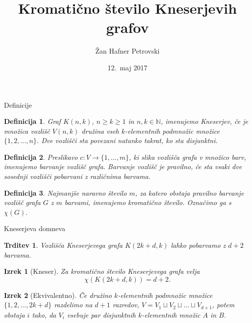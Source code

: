 \documentclass{beamer}
\title{Kromatično število Kneserjevih grafov}
\author{Žan Hafner Petrovski}
\institute{Fakulteta za matematiko in fiziko \\
Oddelek za matematiko}
\date{12.\ maj 2017}
\newtheorem{izrek}{Izrek}
\newtheorem{trditev}{Trditev}
\newtheorem{definicija}{Definicija}
\begin{document}

\begin{frame}
\titlepage
\end{frame}


\begin{frame}{Definicije}

\begin{definicija}
Graf $K(n,k)$, $n \geq k \geq 1$ in $n, k \in \mathbb{N}$, imenujemo \mbox{\alert{Kneserjev}}, če je množica vozlišč $V(n,k)$ družina vseh $k$-elementnih podmnožic množice $\{1, 2, \ldots, n\}$. Dve vozlišči sta povezani natanko takrat, ko sta disjunktni.
\end{definicija}

\pause

\begin{definicija}
Preslikavo $c: V \rightarrow \{1, \ldots, m\}$, ki slika vozlišča grafa v množico barv, imenujemo \alert {barvanje vozlišč grafa}. Barvanje vozlišč je pravilno, če sta vsaki dve sosednji vozlišči pobarvani z različnima barvama.
\end{definicija}

\pause

\begin{definicija}
Najmanjše naravno število $m$, za katero obstaja pravilno barvanje vozlišč grafa $G$ z $m$ barvami, imenujemo \alert {kromatično število}. Označimo ga s $\chi(G).$
\end{definicija}

\end{frame}


\begin{frame}{Kneserjeva domneva}

\begin{trditev}
Vozlišča Kneserjevega grafa $K(2k+d,k)$ lahko pobarvamo z $d+2$ barvama.
\end{trditev}

\pause

\begin{izrek}[Kneser]
Za kromatično število Kneserjevega grafa velja
$$\chi(K(2k+d,k)) = d+2.$$
\end{izrek}

\pause

\begin{izrek}[Ekvivalentno]
Če družino $k$-elementnih podmnožic množice $\{1, 2, \ldots, 2k+d\}$ razdelimo na $d+1$ razredov,  $V = V_1 \sqcup V_2 \sqcup \ldots \sqcup V_{d+1}$, potem obstaja $i$ tako, da $V_i$ vsebuje par disjunktnih $k$-elementnih množic $A$ in $B$.
\end{izrek}

\end{frame}
\end{document}

